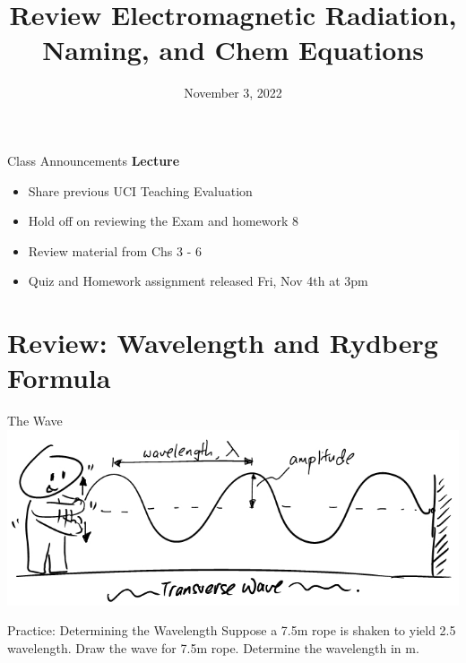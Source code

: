 \documentclass[11pt]{beamer}
\title{Review Electromagnetic Radiation, Naming, and Chem Equations}
\institute{Chemistry Department, Cypress College}
\date{November 3, 2022}
\begin{document}
\begin{frame}
  \titlepage
\end{frame}

\begin{frame}{Class Announcements}
  \textbf{Lecture}
  \begin{itemize}
  \item Share previous UCI Teaching Evaluation
  \item Hold off on reviewing the Exam and homework 8
  \item Review material from Chs 3 - 6
  \item Quiz and Homework assignment released Fri, Nov 4th at 3pm
  \end{itemize}
\end{frame}

\section{Review: Wavelength and Rydberg Formula}

\begin{frame}{The Wave}
  \centering
  \includegraphics[width=\linewidth]{rope_waves}
\end{frame}

\begin{frame}{Practice: Determining the Wavelength}
  Suppose a 7.5m rope is shaken to yield 2.5 wavelength. Draw the
  wave for 7.5m rope. Determine the wavelength in m.
  \vspace{1.5in}
\end{frame}
\end{document}
